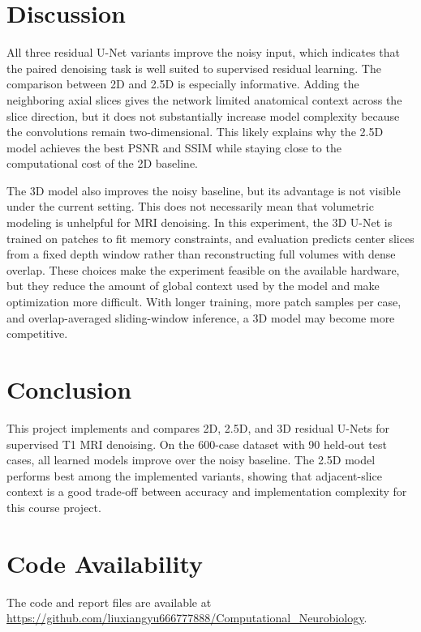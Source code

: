 \documentclass{article}
\begin{document}
\section{Discussion}

All three residual U-Net variants improve the noisy input, which indicates that the paired denoising task is well suited to supervised residual learning. The comparison between 2D and 2.5D is especially informative. Adding the neighboring axial slices gives the network limited anatomical context across the slice direction, but it does not substantially increase model complexity because the convolutions remain two-dimensional. This likely explains why the 2.5D model achieves the best PSNR and SSIM while staying close to the computational cost of the 2D baseline.

The 3D model also improves the noisy baseline, but its advantage is not visible under the current setting. This does not necessarily mean that volumetric modeling is unhelpful for MRI denoising. In this experiment, the 3D U-Net is trained on patches to fit memory constraints, and evaluation predicts center slices from a fixed depth window rather than reconstructing full volumes with dense overlap. These choices make the experiment feasible on the available hardware, but they reduce the amount of global context used by the model and make optimization more difficult. With longer training, more patch samples per case, and overlap-averaged sliding-window inference, a 3D model may become more competitive.

\section{Conclusion}

This project implements and compares 2D, 2.5D, and 3D residual U-Nets for supervised T1 MRI denoising. On the 600-case dataset with 90 held-out test cases, all learned models improve over the noisy baseline. The 2.5D model performs best among the implemented variants, showing that adjacent-slice context is a good trade-off between accuracy and implementation complexity for this course project.

\section*{Code Availability}

The code and report files are available at \url{https://github.com/liuxiangyu666777888/Computational_Neurobiology}.



\end{document}
